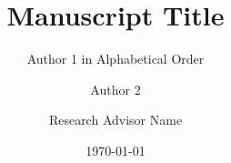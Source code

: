 \documentclass[aps,onecolumn,12pt,letterpaper,amsmath,amssymb,floatfix,pra]{revtex4-1}
\begin{document}
\pagestyle{wjp}
  \setcounter{page}{1}

%
%

\title{Manuscript Title}


\author{Author 1 in Alphabetical Order}
\author{Author 2}
\author{Research Advisor Name}


\date{\today}

%
\end{document}
